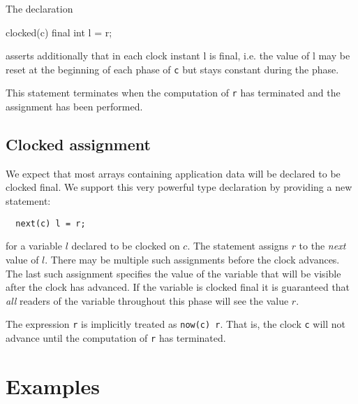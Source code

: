 


The declaration 

\begin{x10}
  clocked(c) final int l = r;
\end{x10}

\noindent asserts additionally that in each clock instant {\cf l} is final, 
i.e.{} the value of {\cf l} may be reset at the beginning of each phase
of {\tt c} but stays constant during the phase.

This statement terminates when the computation of {\tt r} has
terminated and the assignment has been performed.


\subsection{Clocked assignment}
We expect that most arrays containing application data will be
declared to be {\cf clocked final}. We support this very powerful type
declaration by providing a new statement:
{\footnotesize
\begin{verbatim}
  next(c) l = r; 
\end{verbatim}}


\noindent 
for a variable $l$ declared to be clocked on $c$. The statement
assigns $r$ to the {\em next} value of $l$. There may be multiple such
assignments before the clock advances. The last such assignment
specifies the value of the variable that will be visible after the
clock has advanced.  If the variable is {\cf clocked final} it is
guaranteed that {\em all} readers of the variable throughout this
phase will see the value $r$.

The expression {\tt r} is implicitly treated as {\tt now(c) r}. That
is, the clock {\tt c} will not advance until the computation of {\tt r} has
terminated.

\section{Examples}

